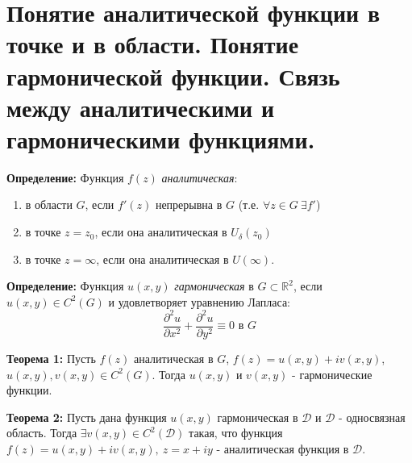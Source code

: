 \section{Понятие аналитической функции в точке и в области. Понятие
гармонической функции. Связь между аналитическими и гармоническими
функциями.}\label{ux43fux43eux43dux44fux442ux438ux435-ux430ux43dux430ux43bux438ux442ux438ux447ux435ux441ux43aux43eux439-ux444ux443ux43dux43aux446ux438ux438-ux432-ux442ux43eux447ux43aux435-ux438-ux432-ux43eux431ux43bux430ux441ux442ux438.-ux43fux43eux43dux44fux442ux438ux435-ux433ux430ux440ux43cux43eux43dux438ux447ux435ux441ux43aux43eux439-ux444ux443ux43dux43aux446ux438ux438.-ux441ux432ux44fux437ux44c-ux43cux435ux436ux434ux443-ux430ux43dux430ux43bux438ux442ux438ux447ux435ux441ux43aux438ux43cux438-ux438-ux433ux430ux440ux43cux43eux43dux438ux447ux435ux441ux43aux438ux43cux438-ux444ux443ux43dux43aux446ux438ux44fux43cux438.}

\textbf{Определение:} Функция \(f(z)\) \emph{аналитическая}:

\begin{enumerate}
\def\labelenumi{\arabic{enumi}.}
\tightlist
\item
  в области \(G\), если \(f'(z)\) непрерывна в \(G\) (т.е.
  \(\forall z\in G \ \exists f'\))
\item
  в точке \(z=z_{0}\), если она аналитическая в \(U_{\delta}(z_{0})\)
\item
  в точке \(z=\infty\), если она аналитическая в \(U(\infty)\).
\end{enumerate}

\textbf{Определение:} Функция \(u(x,y)\) \emph{гармоническая} в
\(G\subset \mathbb{R}^{2}\), если \(u(x,y)\in C^{2}(G)\) и удовлетворяет
уравнению Лапласа: \[
\frac{\partial^{2}u}{\partial x^{2}}+ \frac{\partial^{2}u}{\partial y^{2}}\equiv 0\text{ в }G
\]

\textbf{Теорема 1:} Пусть \(f(z)\) аналитическая в \(G\),
\(f(z)=u(x,y)+iv(x,y)\), \(u(x,y),v(x,y)\in C^{2}(G)\). Тогда \(u(x,y)\)
и \(v(x,y)\) - гармонические функции.

\textbf{Теорема 2:} Пусть дана функция \(u(x,y)\) гармоническая в
\(\mathcal{D}\) и \(\mathcal{D}\) - односвязная область. Тогда
\(\exists v(x,y)\in C^{2}(\mathcal{D})\) такая, что функция
\(f(z)=u(x,y)+iv(x,y), \ z=x+iy\) - аналитическая функция в
\(\mathcal{D}\).
